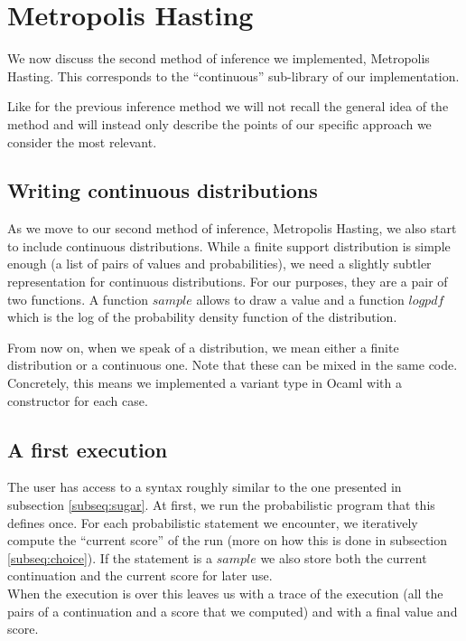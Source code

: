 \documentclass{article}
\begin{document}
\section{Metropolis Hasting}

	We now discuss the second method of inference we implemented, Metropolis Hasting.
	This corresponds to the ``continuous'' sub-library of our implementation.
	
	Like for the previous inference method we will not recall the general idea of the method and will instead only describe the points of our specific approach we consider the most relevant.

	\subsection{Writing continuous distributions}

	As we move to our second method of inference, Metropolis Hasting, we also start to include continuous distributions.
	While a finite support distribution is simple enough (a list of pairs of values and probabilities), we need a slightly subtler representation for continuous distributions.
	For our purposes, they are a pair of two functions. A function $sample$ allows to draw a value and a function $logpdf$ which is the log of the probability density function of the distribution.

	From now on, when we speak of a distribution, we mean either a finite distribution or a continuous one. Note that these can be mixed in the same code.
	Concretely, this means we implemented a variant type in Ocaml with a constructor for each case.

	\subsection{A first execution}

	The user has access to a syntax roughly similar to the one presented in subsection \ref{subseq:sugar}.
	At first, we run the probabilistic program that this defines once.
	For each probabilistic statement we encounter, we iteratively compute the ``current score'' of the run (more on how this is done in subsection \ref{subseq:choice}).
	If the statement is a $sample$ we also store both the current continuation and the current score for later use. \\

	When the execution is over this leaves us with a trace of the execution (all the pairs of a continuation and a score that we computed) and with a final value and score. 
\end{document}
